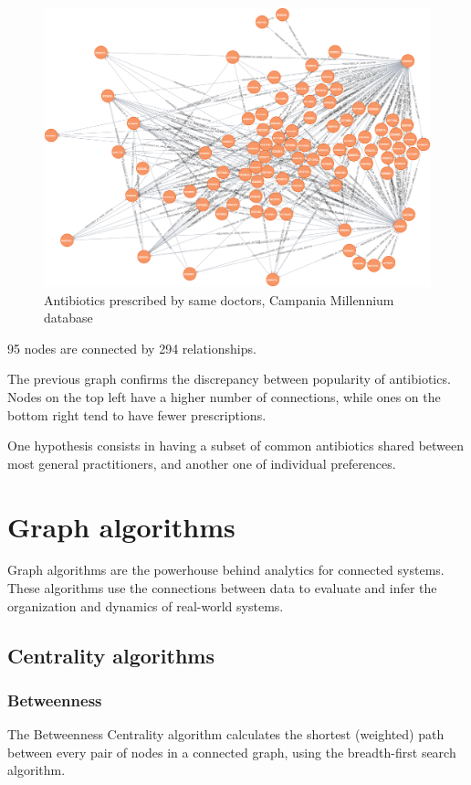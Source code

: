 \begin{figure}[h]
	\centering
	\includegraphics[scale=0.3]{./images/antibiotics-graph.png}
	\caption{\small Antibiotics prescribed by same doctors, Campania Millennium database}
\end{figure}

95 nodes are connected by 294 relationships.

The previous graph confirms the discrepancy between popularity of antibiotics. Nodes on the top left have a higher number of connections, while ones on the bottom right tend to have fewer prescriptions.

One hypothesis consists in having a subset of common antibiotics shared between most general practitioners, and another one of individual preferences.

\section{Graph algorithms}
Graph algorithms are the powerhouse behind analytics for connected systems. These algorithms use the connections between data to evaluate and infer the organization and dynamics of real-world systems\cite{neo4jdocumentation}.

\subsection{Centrality algorithms}

\subsubsection{Betweenness}
The Betweenness Centrality algorithm calculates the shortest (weighted) path between every pair of nodes in a connected graph, using the breadth-first search algorithm. 

